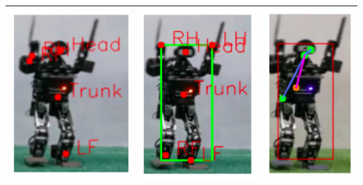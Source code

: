 \begin{table}
\begin{tabular}{|c|c|c|}
    \includegraphics[scale=0.75]{gambar/nimbro-2.png} & \includegraphics[scale=0.75]{gambar/rcnn-2.png} & \includegraphics[scale=0.75]{gambar/yolo-2.png} \\
    \hline

\end{tabular}
\end{table}
